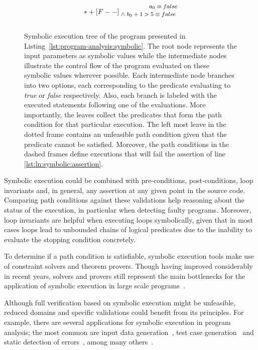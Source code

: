 \begin{figure}[t]
\[{	 *+[F--] \txt{\footnotesize $~~~~~~~~~~~~~~~a_{0} \equiv false$ 
	 \\ \footnotesize $\land ~ b_{0}+1 > 5 \equiv false$
 \\ ~}			
} \]
\caption[Symbolic Execution Tree of a Trivial Program]{Symbolic execution tree of the program presented in Listing~\ref{lst:program-analysis:symbolic}. The root node represents the input parameters as symbolic values while the intermediate nodes illustrate the control flow of the program evaluated on these symbolic values wherever possible. Each intermediate node branches into two options, each corresponding to the predicate evaluating to \textit{true} or \textit{false} respectively. Also, each branch is labeled with the executed statements following one of the evaluations. More importantly, the leaves collect the predicates that form the path condition for that particular execution. The left most leave in the dotted frame contains an unfeasible path condition given that the predicate cannot be satisfied. Moreover, the path conditions in the dashed frames define executions that will fail the assertion of line \ref{lst:ln:symbolic:assertion}.}
\label{fig:program-analysis:symbolic}
\end{figure}

Symbolic execution could be combined with pre-conditions, post-conditions, loop invariants and, in general, any assertion at any given point in the source code. Comparing path conditions against these validations help reasoning about the status of the execution, in particular when detecting faulty programs. Moreover, loop invariants are helpful when executing loops symbolically, given that in most cases loops lead to unbounded chains of logical predicates due to the inability to evaluate the stopping condition concretely.

To determine if a path condition is satisfiable, symbolic execution tools make use of constraint solvers and theorem provers. Though having improved considerably in recent years, solvers and provers still represent the main bottlenecks for the application of symbolic execution in large scale programs~\cite{Cadar2013}. 

Although full verification based on symbolic execution might be unfeasible, reduced domains and specific validations could benefit from its principles. For example, there are several applications for symbolic execution in program analysis; the most common are input data generation~\cite{Clarke1976}, test case generation~\cite{Cadar2008,Csallner,Godefroid2008,Visser2004a} and static detection of errors~\cite{Bush2000,Tomb2007}, among many others~\cite{Csallner2008,Siegel2006}.